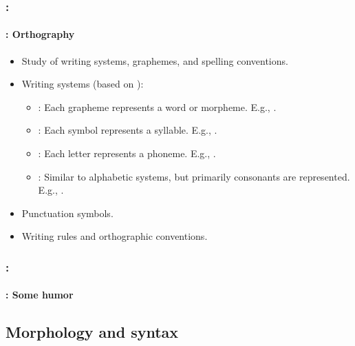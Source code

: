\documentclass[xcolor=table]{beamer}
\begin{document}
\begin{frame}
	\frametitle{\insertshortsubtitle: \insertsection}
	\framesubtitle{\insertsubsection: Orthography}

	\begin{itemize}
		\item Study of writing systems, graphemes, and spelling conventions.
		\item Writing systems (based on ):
		\begin{itemize}
			\item {}: Each grapheme represents a word or morpheme. 
			E.g., .
			
			\item {}: Each symbol represents a syllable. 
			E.g., .
			
			\item {}: Each letter represents a phoneme. 
			E.g., .
			
			\item {}: Similar to alphabetic systems, but primarily consonants are represented. 
			E.g., .
		\end{itemize}
		\item Punctuation symbols.
		\item Writing rules and orthographic conventions.
	\end{itemize}

\end{frame}

\begin{frame}
	\frametitle{\insertshortsubtitle: \insertsection}
	\framesubtitle{\insertsubsection: Some humor}

	\begin{center}
	\end{center}

\end{frame}

\subsection{Morphology and syntax}
\end{document}
